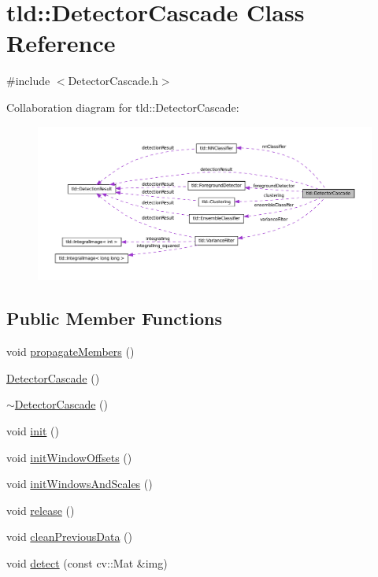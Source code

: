 \hypertarget{classtld_1_1_detector_cascade}{
\section{tld::DetectorCascade Class Reference}
\label{classtld_1_1_detector_cascade}
}


{\ttfamily \#include $<$DetectorCascade.h$>$}



Collaboration diagram for tld::DetectorCascade:
\nopagebreak
\begin{figure}[H]
\begin{center}
\leavevmode
\includegraphics[width=400pt]{classtld_1_1_detector_cascade__coll__graph}
\end{center}
\end{figure}
\subsection*{Public Member Functions}
\begin{DoxyCompactItemize}
\item 
void \hyperlink{classtld_1_1_detector_cascade_a809e13a6c7fbc1c13dcb9b4bf9d22964}{propagateMembers} ()
\item 
\hyperlink{classtld_1_1_detector_cascade_a709b4d4802e4f8391fad8fd1b6f892eb}{DetectorCascade} ()
\item 
\hyperlink{classtld_1_1_detector_cascade_a1154ee7d1fd731055af1f6b5b697d8ba}{$\sim$DetectorCascade} ()
\item 
void \hyperlink{classtld_1_1_detector_cascade_a98d5393088a53188dcde7d530101534a}{init} ()
\item 
void \hyperlink{classtld_1_1_detector_cascade_a39760d6c54ddb41785ffd05a7b881d8d}{initWindowOffsets} ()
\item 
void \hyperlink{classtld_1_1_detector_cascade_a0515043558291c0bfbd5d403315c0334}{initWindowsAndScales} ()
\item 
void \hyperlink{classtld_1_1_detector_cascade_a4658f60cc03595d55920b4949ff26a69}{release} ()
\item 
void \hyperlink{classtld_1_1_detector_cascade_a56b148b63e2c592624c90bc7f7f50d68}{cleanPreviousData} ()
\item 
void \hyperlink{classtld_1_1_detector_cascade_a4ec511b5488bd1a1dc241e6dac191165}{detect} (const cv::Mat \&img)
\end{DoxyCompactItemize}
